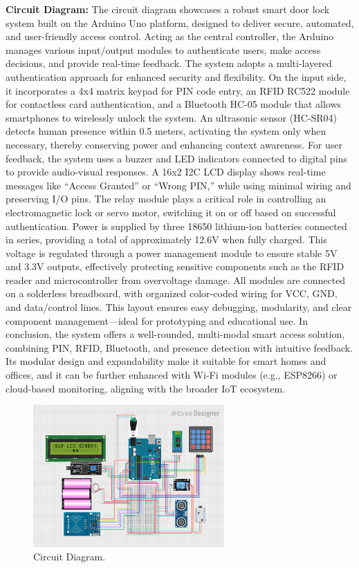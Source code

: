\documentclass[conference, onecolumn]{IEEEtran}
\begin{document}
\textbf{Circuit Diagram:} The circuit diagram showcases a robust smart door lock system built on the Arduino Uno platform, designed to deliver secure, automated, and user-friendly access control. Acting as the central controller, the Arduino manages various input/output modules to authenticate users, make access decisions, and provide real-time feedback. The system adopts a multi-layered authentication approach for enhanced security and flexibility.
On the input side, it incorporates a 4x4 matrix keypad for PIN code entry, an RFID RC522 module for contactless card authentication, and a Bluetooth HC-05 module that allows smartphones to wirelessly unlock the system. An ultrasonic sensor (HC-SR04) detects human presence within 0.5 meters, activating the system only when necessary, thereby conserving power and enhancing context awareness.
For user feedback, the system uses a buzzer and LED indicators connected to digital pins to provide audio-visual responses. A 16x2 I2C LCD display shows real-time messages like “Access Granted” or “Wrong PIN,” while using minimal wiring and preserving I/O pins.
The relay module plays a critical role in controlling an electromagnetic lock or servo motor, switching it on or off based on successful authentication. Power is supplied by three 18650 lithium-ion batteries connected in series, providing a total of approximately 12.6V when fully charged. This voltage is regulated through a power management module to ensure stable 5V and 3.3V outputs, effectively protecting sensitive components such as the RFID reader and microcontroller from overvoltage damage.
All modules are connected on a solderless breadboard, with organized color-coded wiring for VCC, GND, and data/control lines. This layout ensures easy debugging, modularity, and clear component management—ideal for prototyping and educational use.
In conclusion, the system offers a well-rounded, multi-modal smart access solution, combining PIN, RFID, Bluetooth, and presence detection with intuitive feedback. Its modular design and expandability make it suitable for smart homes and offices, and it can be further enhanced with Wi-Fi modules (e.g., ESP8266) or cloud-based monitoring, aligning with the broader IoT ecosystem.

\begin{figure}[H]
	\centering
	\includegraphics[width=0.65\textwidth]{cri.jpg}
	\caption{Circuit Diagram.}
	\label{fig9}
\end{figure}	
\end{document}
